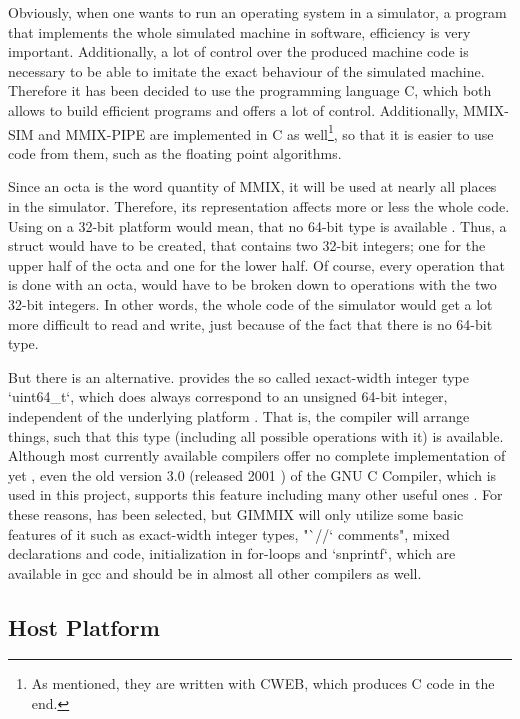 Obviously, when one wants to run an operating system in a simulator, \ie a program that implements the whole simulated machine in software, efficiency is very important. Additionally, a lot of control over the produced machine code is necessary to be able to imitate the exact behaviour of the simulated machine. Therefore it has been decided to use the programming language C, which both allows to build efficient programs and offers a lot of control. Additionally, MMIX-SIM and MMIX-PIPE are implemented in C as well\footnote{As mentioned, they are written with CWEB, which produces C code in the end.}, so that it is easier to use code from them, such as the floating point algorithms.

Since an octa is the word quantity of MMIX, it will be used at nearly all places in the simulator. Therefore, its representation affects more or less the whole code. Using  on a 32-bit platform would mean, that no 64-bit type is available \citep{llgccext}. Thus, a struct would have to be created, that contains two 32-bit integers; one for the upper half of the octa and one for the lower half. Of course, every operation that is done with an octa, would have to be broken down to operations with the two 32-bit integers. In other words, the whole code of the simulator would get a lot more difficult to read and write, just because of the fact that there is no 64-bit type.

But there is an alternative.  provides the so called \i{exact-width integer type} `uint64_t`, which does always correspond to an unsigned 64-bit integer, independent of the underlying platform \citep{uint64t}. That is, the compiler will arrange things, such that this type (including all possible operations with it) is available. Although most currently available compilers offer no complete implementation of  yet \citep{c99supp}, even the old version 3.0 (released 2001 \citep{gccrel}) of the GNU C Compiler, which is used in this project, supports this feature including many other useful ones \citep{gcc30c99}. For these reasons,  has been selected, but GIMMIX will only utilize some basic features of it such as exact-width integer types, "`//` comments", mixed declarations and code, initialization in for-loops and `snprintf`, which are available in \gls{gcc} and should be in almost all other compilers as well.

\subsection{Host Platform}

